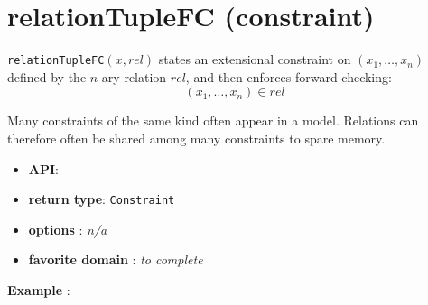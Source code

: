 \label{relationtuplefc}
\hypertarget{relationtuplefc}{}

\section{relationTupleFC (constraint)}\label{relationtuplefc:relationtuplefcconstraint}\hypertarget{relationtuplefc:relationtuplefcconstraint}{}
\begin{notedef}
  \texttt{relationTupleFC}$(x,rel)$ states an extensional constraint on $(x_1,\ldots,x_n)$ defined by the $n$-ary relation $rel$, and then enforces forward checking:
$$(x_1,\ldots,x_n)\in rel$$
\end{notedef}
Many constraints of the same kind often appear in a model. Relations can therefore often be shared among many constraints to spare memory.

\begin{itemize}
	\item \textbf{API}: 
	\item \textbf{return type}: \texttt{Constraint}
	\item \textbf{options} : \emph{n/a}
	\item \textbf{favorite domain} : \emph{to complete}
\end{itemize}

\textbf{Example} :
